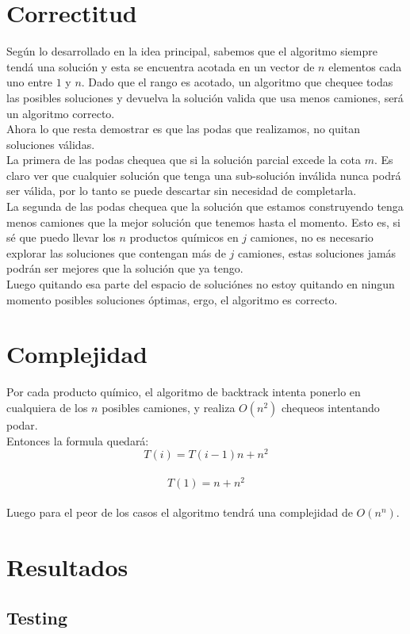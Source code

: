 \section{Correctitud}
Seg\'un lo desarrollado en la idea principal, sabemos que el algoritmo siempre tend\'a una soluci\'on y esta se encuentra acotada en un vector de $n$ elementos cada uno entre $1$ y $n$. Dado que el rango es acotado, un algoritmo que chequee todas las posibles soluciones y devuelva la soluci\'on valida que usa menos camiones, ser\'a un algoritmo correcto.
\\
Ahora lo que resta demostrar es que las podas que realizamos, no quitan soluciones v\'alidas.
\\
La primera de las podas chequea que si la soluci\'on parcial excede la cota $m$. Es claro ver que cualquier soluci\'on que tenga una sub-soluci\'on inv\'alida nunca podr\'a ser v\'alida, por lo tanto se puede descartar sin necesidad de completarla.
\\
La segunda de las podas chequea que la soluci\'on que estamos construyendo tenga menos camiones que la mejor soluci\'on que tenemos hasta el momento. Esto es, si s\'e que puedo llevar los $n$ productos qu\'imicos en $j$ camiones, no es necesario explorar las soluciones que contengan m\'as de $j$ camiones, estas soluciones jam\'as podr\'an ser mejores que la soluci\'on que ya tengo.
\\
Luego quitando esa parte del espacio de soluci\'ones no estoy quitando en ningun momento posibles soluciones \'optimas, ergo, el algoritmo es correcto.  
\\
\section{Complejidad}
Por cada producto qu\'imico, el algoritmo de backtrack intenta ponerlo en cualquiera de los $n$ posibles camiones, y realiza $O(n^2)$ chequeos intentando podar.
\\
Entonces la formula quedar\'a:
\\
$$T(i) = T(i-1)n + n^2$$
\\
$$T(1) = n + n^2$$
\\
Luego para el peor de los casos el algoritmo tendr\'a una complejidad de $O(n^n)$.
\\
\section{Resultados}
\subsection{Testing}

